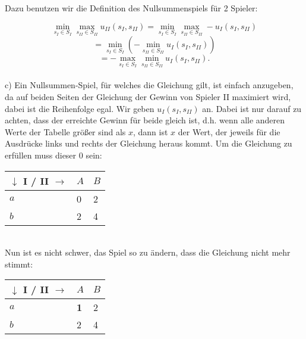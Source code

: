 \documentclass{scrartcl}
\begin{document}
Dazu benutzen wir die Definition des Nullsummenspiels für 2 Spieler:

\[
\min_{s_I \in S_I} \max_{s_{II} \in S_{II}} u_{II}(s_I,s_{II}) = \min_{s_I \in S_I} \max_{s_{II} 
\in S_{II}} - u_{I}(s_I,s_{II})
\]
\[
= \min_{s_I \in S_I} ( -\min_{s_{II} \in S_{II}} u_{I}(s_I,s_{II}))
\]
\[
= - \max_{s_I \in S_I} \min_{s_{II} \in S_{II}} u_{I}(s_I,s_{II}).
\] \\

c) Ein Nullsummen-Spiel, für welches die Gleichung gilt, ist einfach anzugeben, da auf beiden
Seiten der Gleichung der Gewinn von Spieler II maximiert wird, dabei ist die Reihenfolge
egal. Wir geben $u_I(s_I,s_{II})$ an. Dabei ist nur darauf zu achten, dass der erreichte Gewinn
für beide gleich ist, d.h. wenn alle anderen Werte der Tabelle größer sind als $x$, dann ist
$x$ der Wert, der jeweils für die Ausdrücke links und rechts der Gleichung heraus kommt. Um die
Gleichung zu erfüllen muss dieser 0 sein: \\

\begin{tabularx}{0.5\textwidth} {|X|X|X|}
\hline
$\downarrow$ I / II $\rightarrow$	& $A$		& $B$	\\
\hline
$a$									& 0		& 	2\\
\hline
$b$									& 2		& 	4\\
\hline
\end{tabularx} \\

Nun ist es nicht schwer, das Spiel so zu ändern, dass die Gleichung nicht mehr stimmt:

\begin{tabularx}{0.5\textwidth} {|X|X|X|}
\hline
$\downarrow$ I / II $\rightarrow$	& $A$		& $B$	\\
\hline
$a$									& \textbf{1}		& 	2\\
\hline
$b$									& 2		& 	4\\
\hline
\end{tabularx} \\
\end{document}
